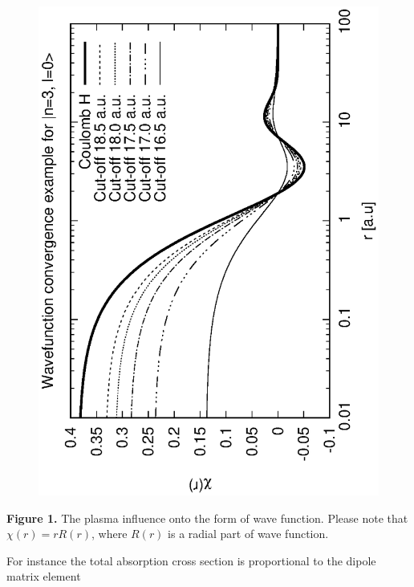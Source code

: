 \documentclass[a1]{sciposter}
\begin{document}
\begin{multicols}{3}
\begin{figure}
\begin{center}
\includegraphics[angle=-90,width=\textwidth]{fig/psi_n_3_l_0.eps}
\label{fig::1}
\end{center}
\end{figure}

\begin{center}
{{\bf Figure 1.} The plasma influence onto the form of wave function. Please note that $\chi (r) = r R(r)$, where $R(r)$ is a radial part of wave function.}
\end{center}




For instance the total absorption cross section is proportional to the dipole matrix element


\end{multicols}
\end{document}
